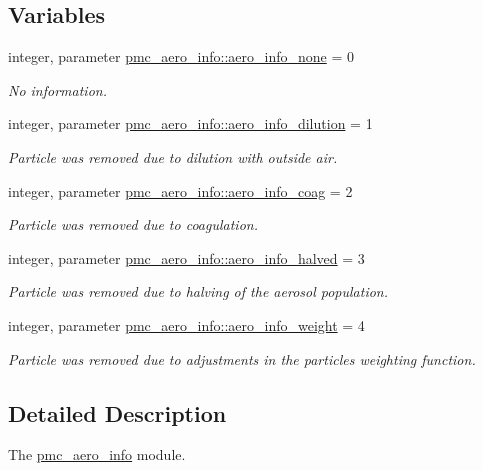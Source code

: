 \subsection*{Variables}
\begin{DoxyCompactItemize}
\item 
integer, parameter \mbox{\hyperlink{namespacepmc__aero__info_ad921514d23f504dc3475f673268bd460}{pmc\+\_\+aero\+\_\+info\+::aero\+\_\+info\+\_\+none}} = 0
\begin{DoxyCompactList}\small\item\em No information. \end{DoxyCompactList}\item 
integer, parameter \mbox{\hyperlink{namespacepmc__aero__info_adf5e66ac6e17ba53b17242778445b6af}{pmc\+\_\+aero\+\_\+info\+::aero\+\_\+info\+\_\+dilution}} = 1
\begin{DoxyCompactList}\small\item\em Particle was removed due to dilution with outside air. \end{DoxyCompactList}\item 
integer, parameter \mbox{\hyperlink{namespacepmc__aero__info_a92cadac9fad64e1c1c5b2878672e1c75}{pmc\+\_\+aero\+\_\+info\+::aero\+\_\+info\+\_\+coag}} = 2
\begin{DoxyCompactList}\small\item\em Particle was removed due to coagulation. \end{DoxyCompactList}\item 
integer, parameter \mbox{\hyperlink{namespacepmc__aero__info_a80aed32f3d631b141971d2566a31ec25}{pmc\+\_\+aero\+\_\+info\+::aero\+\_\+info\+\_\+halved}} = 3
\begin{DoxyCompactList}\small\item\em Particle was removed due to halving of the aerosol population. \end{DoxyCompactList}\item 
integer, parameter \mbox{\hyperlink{namespacepmc__aero__info_a458b6653bdab26796cced7b90c68fbc6}{pmc\+\_\+aero\+\_\+info\+::aero\+\_\+info\+\_\+weight}} = 4
\begin{DoxyCompactList}\small\item\em Particle was removed due to adjustments in the particle\textquotesingle{}s weighting function. \end{DoxyCompactList}\end{DoxyCompactItemize}


\subsection{Detailed Description}
The \mbox{\hyperlink{namespacepmc__aero__info}{pmc\+\_\+aero\+\_\+info}} module. 

